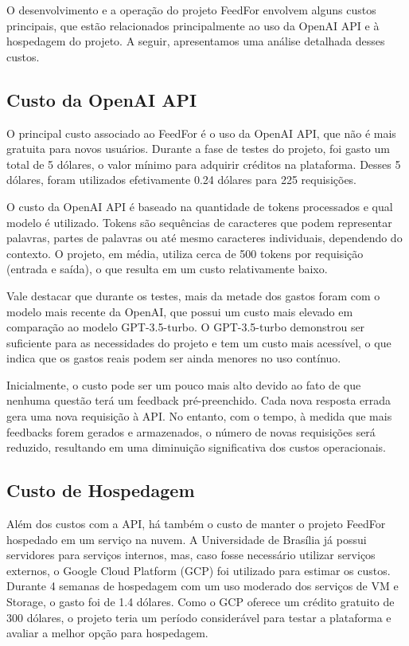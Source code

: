 O desenvolvimento e a operação do projeto FeedFor envolvem alguns custos principais, que estão relacionados principalmente ao uso da OpenAI API e à hospedagem do projeto. A seguir, apresentamos uma análise detalhada desses custos.

\subsection{Custo da OpenAI API}

O principal custo associado ao FeedFor é o uso da OpenAI API, que não é mais gratuita para novos usuários. Durante a fase de testes do projeto, foi gasto um total de 5 dólares, o valor mínimo para adquirir créditos na plataforma. Desses 5 dólares, foram utilizados efetivamente 0.24 dólares para 225 requisições.

O custo da OpenAI API é baseado na quantidade de tokens processados e qual modelo é utilizado. Tokens são sequências de caracteres que podem representar palavras, partes de palavras ou até mesmo caracteres individuais, dependendo do contexto. O projeto, em média, utiliza cerca de 500 tokens por requisição (entrada e saída), o que resulta em um custo relativamente baixo.

Vale destacar que durante os testes, mais da metade dos gastos foram com o modelo mais recente da OpenAI, que possui um custo mais elevado em comparação ao modelo GPT-3.5-turbo. O GPT-3.5-turbo demonstrou ser suficiente para as necessidades do projeto e tem um custo mais acessível, o que indica que os gastos reais podem ser ainda menores no uso contínuo.

Inicialmente, o custo pode ser um pouco mais alto devido ao fato de que nenhuma questão terá um feedback pré-preenchido. Cada nova resposta errada gera uma nova requisição à API. No entanto, com o tempo, à medida que mais feedbacks forem gerados e armazenados, o número de novas requisições será reduzido, resultando em uma diminuição significativa dos custos operacionais.

\subsection{Custo de Hospedagem}

Além dos custos com a API, há também o custo de manter o projeto FeedFor hospedado em um serviço na nuvem. A Universidade de Brasília já possui servidores para serviços internos, mas, caso fosse necessário utilizar serviços externos, o Google Cloud Platform (GCP) foi utilizado para estimar os custos. Durante 4 semanas de hospedagem com um uso moderado dos serviços de VM e Storage, o gasto foi de 1.4 dólares. Como o GCP oferece um crédito gratuito de 300 dólares, o projeto teria um período considerável para testar a plataforma e avaliar a melhor opção para hospedagem.

